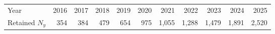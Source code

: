 \begin{tabular}{l*{10}{r}}
\toprule
Year & 2016 & 2017 & 2018 & 2019 & 2020 & 2021 & 2022 & 2023 & 2024 & 2025 \\
Retained $N_y$ & 354 & 384 & 479 & 654 & 975 & 1,055 & 1,288 & 1,479 & 1,891 & 2,520 \\
\bottomrule
\end{tabular}
